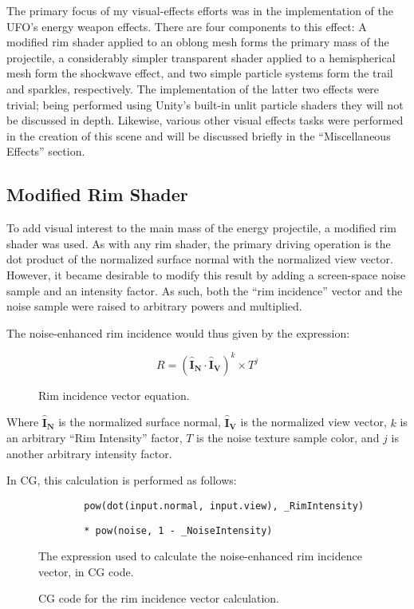 The primary focus of my visual-effects efforts was in the implementation of the UFO's energy weapon effects.
There are four components to this effect: A modified rim shader applied to an oblong mesh forms the primary mass of the projectile, a considerably simpler transparent shader applied to a hemispherical mesh form the shockwave effect, and two simple particle systems form the trail and sparkles, respectively. The implementation of the latter two effects were trivial; being performed using Unity's built-in unlit particle shaders they will not be discussed in depth. Likewise, various other visual effects tasks were performed in the creation of this scene and will be discussed briefly in the ``Miscellaneous Effects'' section.

\subsection{Modified Rim Shader}
To add visual interest to the main mass of the energy projectile, a modified rim shader was used. As with any rim shader, the primary driving operation is the dot product of the normalized surface normal with the normalized view vector. However, it became desirable to modify this result by adding a screen-space noise sample and an intensity factor. As such, both the ``rim incidence'' vector and the noise sample were raised to arbitrary powers and multiplied.

The noise-enhanced rim incidence would thus given by the expression:

\begin{figure}[h]
	\centering
	\[
		R = (\mathbf{\hat{I}_N} \cdot \mathbf{\hat{I}_V})^k \times T^j
	\]
	\caption{Rim incidence vector equation.}
\end{figure}

Where $\mathbf{\hat{I}_N}$ is the normalized surface normal, $\mathbf{\hat{I}_V}$ is the normalized view vector, $k$ is an arbitrary ``Rim Intensity'' factor, $T$ is the noise texture sample color, and $j$ is another arbitrary intensity factor.

In CG, this calculation is performed as follows:

\begin{figure}[h]
	\begin{verbatim}
		pow(dot(input.normal, input.view), _RimIntensity)
	\end{verbatim}
	\begin{verbatim}
		* pow(noise, 1 - _NoiseIntensity)
	\end{verbatim}
	\caption{CG code for the rim incidence vector calculation.}{The expression used to calculate the noise-enhanced rim incidence vector, in CG code.}
\end{figure}

